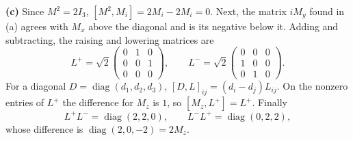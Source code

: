 \textbf{(c)} Since $M^2=2I_3$, $[M^2,M_i]=2M_i-2M_i=0$.
Next, the matrix $iM_y$ found in (a) agrees with $M_x$ above the
diagonal and is its negative below it.
Adding and subtracting, the raising and lowering matrices are
\[
L^+=\sqrt2\begin{pmatrix}0&1&0\\0&0&1\\0&0&0\end{pmatrix},
\qquad L^-=\sqrt2\begin{pmatrix}0&0&0\\1&0&0\\0&1&0\end{pmatrix}.
\]
For a diagonal $D=\operatorname{diag}(d_1,d_2,d_3)$,
$[D,L]_{ij}=(d_i-d_j)L_{ij}$. On the nonzero entries of $L^+$
the difference for $M_z$ is $1$, so $[M_z,L^+]=L^+$.
Finally
\[
L^+L^-=\operatorname{diag}(2,2,0),\qquad
L^-L^+=\operatorname{diag}(0,2,2),
\]
whose difference is $\operatorname{diag}(2,0,-2)=2M_z$.

